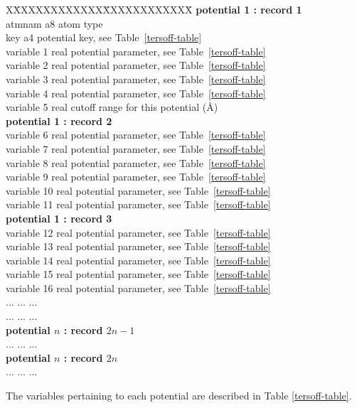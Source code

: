 \begin{enumerate}
\begin{itemize}
\begin{tabbing}
X\=XXXXXXXXXXXX\=XXXXXXXXXXXX\=\kill
{\bf potential 1 : record 1} \\
\> atmnam       \> a8   \> atom type \\
\> key          \> a4   \> potential key, see Table~\ref{tersoff-table} \\
\> variable 1   \> real \> potential parameter, see Table~\ref{tersoff-table} \\
\> variable 2   \> real \> potential parameter, see Table~\ref{tersoff-table} \\
\> variable 3   \> real \> potential parameter, see Table~\ref{tersoff-table} \\
\> variable 4   \> real \> potential parameter, see Table~\ref{tersoff-table} \\
\> variable 5   \> real \> cutoff range for this potential (\AA) \\
{\bf potential 1 : record 2} \\
\> variable 6   \> real \> potential parameter, see Table~\ref{tersoff-table} \\
\> variable 7   \> real \> potential parameter, see Table~\ref{tersoff-table} \\
\> variable 8   \> real \> potential parameter, see Table~\ref{tersoff-table} \\
\> variable 9   \> real \> potential parameter, see Table~\ref{tersoff-table} \\
\> variable 10  \> real \> potential parameter, see Table~\ref{tersoff-table} \\
\> variable 11  \> real \> potential parameter, see Table~\ref{tersoff-table} \\
{\bf potential 1 : record 3} \\
\> variable 12  \> real \> potential parameter, see Table~\ref{tersoff-table} \\
\> variable 13  \> real \> potential parameter, see Table~\ref{tersoff-table} \\
\> variable 14  \> real \> potential parameter, see Table~\ref{tersoff-table} \\
\> variable 15  \> real \> potential parameter, see Table~\ref{tersoff-table} \\
\> variable 16  \> real \> potential parameter, see Table~\ref{tersoff-table} \\
\> ... \> ... \> ... \\
\> ... \> ... \> ... \\
{\bf potential $n$ : record $2n-1$} \\
\> ... \> ... \> ... \\
{\bf potential $n$ : record $2n$} \\
\> ... \> ... \> ...
\end{tabbing}
\end{itemize}
The variables pertaining to each potential are described in Table
\ref{tersoff-table}.


\end{enumerate}
